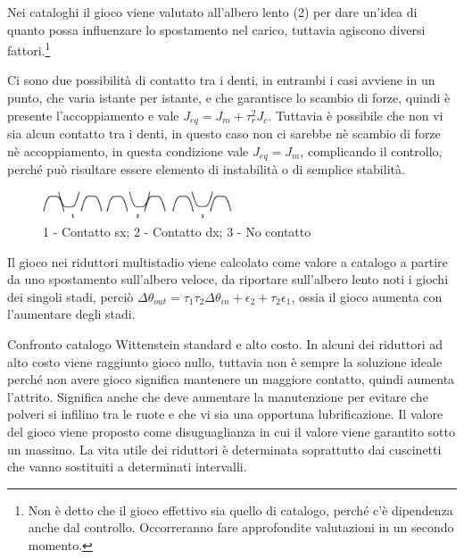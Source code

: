 Nei cataloghi il gioco viene valutato all'albero lento (2) per dare un'idea di quanto possa influenzare lo spostamento nel carico, tuttavia agiscono diversi fattori.\footnote{Non è detto che il gioco effettivo sia quello di catalogo, perché c'è dipendenza anche dal controllo. Occorreranno fare approfondite valutazioni in un secondo momento.}

Ci sono due possibilità di contatto tra i denti, in entrambi i casi avviene in un punto, che varia istante per istante, e che garantisce lo scambio di forze, quindi è presente l'accoppiamento e vale $J_{eq}=J_m+\tau_r^2 J_c$. 
Tuttavia è possibile che non vi sia alcun contatto tra i denti, in questo caso non ci sarebbe nè scambio di forze nè accoppiamento, in questa condizione vale $J_{eq}=J_m$, complicando il controllo, perché può risultare essere elemento di instabilità o di semplice stabilità.

\begin{figure}[h]
    \centering
    \includegraphics[width=0.5\textwidth]{Immagini/config_denti_gioco.png}
    \caption{1 - Contatto sx; 2 - Contatto dx; 3 - No contatto}
\end{figure}

Il gioco nei riduttori multistadio viene calcolato come valore a catalogo a partire da uno spostamento sull'albero veloce, da riportare sull'albero lento noti i giochi dei singoli stadi, perciò \( \Delta \theta_{out} = \tau_1\tau_2\Delta \theta_{in} + \epsilon_2 +\tau_2\epsilon_1 \), ossia il gioco aumenta con l'aumentare degli stadi.

Confronto catalogo Wittenstein standard e alto costo. In alcuni dei riduttori ad alto costo viene raggiunto gioco nullo, tuttavia non è sempre la soluzione ideale perché non avere gioco significa mantenere un maggiore contatto, quindi aumenta l'attrito. Significa anche che deve aumentare la manutenzione per evitare che polveri si infilino tra le ruote e che vi sia una opportuna lubrificazione. 
Il valore del gioco viene proposto come disuguaglianza in cui il valore viene garantito sotto un massimo.
La vita utile dei riduttori è determinata soprattutto dai cuscinetti che vanno sostituiti a determinati intervalli.

